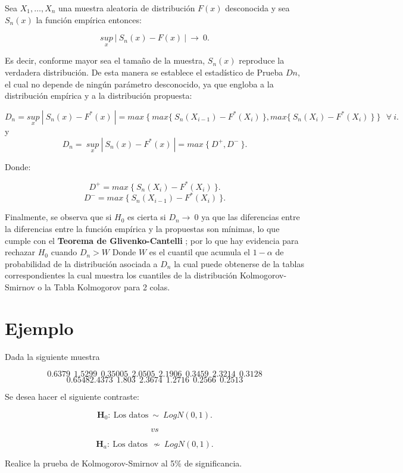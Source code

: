 \documentclass[
  a4paper,
  oneside,
  openany]{book}
\begin{document}
Sea \(X_{1},\ldots,X_{n}\) una muestra aleatoria de distribución \(F(x)\) desconocida y sea \(S_{n}(x)\) la función empírica entonces:

\[\underset{x}{sup} \ |\ S_{n}(x)-F(x) \ | \ \longrightarrow \ 0.\]

Es decir, conforme mayor sea el tamaño de la muestra, \(S_{n}(x)\) reproduce la verdadera distribución. De esta manera se establece el estadístico de Prueba \(Dn\), el cual no depende de ningún parámetro desconocido, ya que engloba a la distribución empírica y a la distribución propuesta:

\[D_{n}=\underset{x}{sup} \ | \ S_{n}(x)-F^*(x) \ |=max \  \{ \ max \{ \  S_{n}(X_{i-1})-F^*(X_{i}) \ \},max \{ \  S_{n}(X_{i})-F^*(X_{i}) \ \} \ \} \ \  \ \forall \ i.\]
y \[D_{n}= \ \underset{x}{sup} \ | \ S_{n}(x)-F^*(x) \ |=max \ \{ \  D^+,D^- \ \}.\]

Donde:

\[D^+= max \ \{ \  S_{n}(X_{i})-F^*(X_{i}) \ \}.\]
\[D^-= max \  \{ \ S_{n}(X_{i-1})-F^*(X_{i}) \ \}.\]

Finalmente, se observa que si \(H_0\) es cierta si \(D_{n} \longrightarrow \ 0\) ya que las diferencias entre la diferencias entre la función empírica y la propuestas son mínimas, lo que cumple con el \textbf{Teorema de Glivenko-Cantelli} ; por lo que hay evidencia para rechazar \(H_0\) cuando \(D_{n} > W\) Donde \(W\) es el cuantil que acumula el \(1- \alpha\) de probabilidad de la distribución asociada a \(D_{n}\) la cual puede obtenerse de la tablas correspondientes la cual muestra los cuantiles de la distribución
Kolmogorov-Smirnov o la Tabla Kolmogorov para 2 colas.

\hypertarget{ejemplo-13}{%
\section{Ejemplo}\label{ejemplo-13}}

Dada la siguiente muestra

\[0.6379 \ \ 1.5299 \ \ 0.35005 \ \ 2.0505 \ \ 2.1906 \ \ 0.3459 \ \ 2.3214 \ \ 0.3128\]
\[ 0.65482.4373 \ \ 1.803 \ \ 2.3674 \ \ 1.2716 \ \ 0.2566 \ \ 0.2513\]

Se desea hacer el siguiente contraste:

\[\textbf{H}_0: \ \mbox{Los datos} \  \sim  \ LogN(0,1).\]

\[vs\]

\[\textbf{H}_a: \ \mbox{Los datos} \ \ \nsim \ LogN(0,1).\]

Realice la prueba de Kolmogorov-Smirnov al 5\% de significancia.
\end{document}
